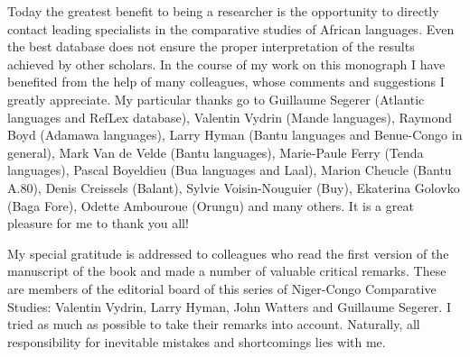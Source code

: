 
Today the greatest benefit to being a researcher is the opportunity to directly contact leading specialists in the comparative studies of African languages. Even the best database does not ensure the proper interpretation of the results achieved by other scholars. In the course of my work on this monograph I have benefited from the help of many colleagues, whose comments and suggestions I greatly appreciate.  My particular thanks go to Guillaume Segerer (Atlantic languages and RefLex database), Valentin Vydrin (Mande languages), Raymond Boyd (Adamawa languages), Larry Hyman (Bantu languages and Benue-Congo in general), Mark Van de Velde (Bantu languages), Marie-Paule Ferry (Tenda languages), Pascal Boyeldieu (Bua languages and Laal), Marion Cheucle (Bantu A.80), Denis Creissels (Balant), Sylvie Voisin-Nouguier (Buy), Ekaterina Golovko (Baga Fore), Odette Ambouroue (Orungu) and many others. It is a great pleasure for me to thank you all!

My special gratitude is addressed to colleagues who read the first version of the manuscript of the book and made a number of valuable critical remarks. These are members of the editorial board of this series of Niger-Congo Comparative Studies: Valentin Vydrin, Larry Hyman, John Watters and Guillaume Segerer. I tried as much as possible to take their remarks into account. Naturally, all responsibility for inevitable mistakes and shortcomings lies with me.
